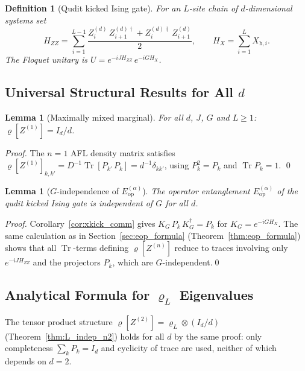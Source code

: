 \documentclass[12pt,a4paper]{article}
\newtheorem{lemma}[theorem]{Lemma}
\newtheorem{definition}[theorem]{Definition}
\begin{document}
\begin{definition}[Qudit kicked Ising gate]
For an $L$-site chain of $d$-dimensional systems set
\[
  H_{ZZ} = \sum_{i=1}^{L-1}\frac{Z^{(d)}_{i}\,Z^{(d)\dagger}_{i+1}
  + Z^{(d)\dagger}_{i}\,Z^{(d)}_{i+1}}{2},
  \qquad
  H_{X} = \sum_{i=1}^{L} X_{\mathrm{h},i}.
\]
The Floquet unitary is $U = e^{-iJ H_{ZZ}}\,e^{-iG H_{X}}$.
\end{definition}

\subsection{Universal Structural Results for All $d$}

\begin{lemma}[Maximally mixed marginal]\label{lem:rho1_Id}
For all $d$, $J$, $G$ and $L\ge 1$:
$\varrho[Z^{(1)}] = I_{d}/d$.
\end{lemma}

\begin{proof}
The $n=1$ AFL density matrix satisfies
$\varrho[Z^{(1)}]_{k,k'} = D^{-1}\operatorname{Tr}[P_{k'}\,P_{k}] = d^{-1}\delta_{kk'}$,
using $P_{k}^{2}=P_{k}$ and $\operatorname{Tr} P_{k}=1$.
\qed
\end{proof}

\begin{lemma}[$G$-independence of $E^{(\alpha)}_{\mathrm{op}}$]\label{lem:g_indep_qudit}
The operator entanglement $E^{(\alpha)}_{\mathrm{op}}$ of the qudit kicked Ising gate
is independent of $G$ for all $d$.
\end{lemma}

\begin{proof}
Corollary~\ref{cor:xkick_comm} gives $K_{G}\,P_{k}\,K_{G}^{\dagger}=P_{k}$ for
$K_{G}=e^{-iG H_{X}}$.  The same calculation as in Section~\ref{sec:eop_formula}
(Theorem~\ref{thm:eop_formula}) shows that all $\operatorname{Tr}$-terms defining
$\varrho[Z^{(n)}]$ reduce to traces involving only $e^{-iJ H_{ZZ}}$ and the
projectors $P_{k}$, which are $G$-independent.\qed
\end{proof}

\subsection{Analytical Formula for $\varrho_{L}$ Eigenvalues}

The tensor product structure $\varrho[Z^{(2)}] = \varrho_{L}\otimes(I_{d}/d)$
(Theorem~\ref{thm:L_indep_n2}) holds for all $d$ by the same proof:
only completeness $\sum_{k}P_{k}=I_{d}$ and cyclicity of trace are used,
neither of which depends on $d=2$.
\end{document}
